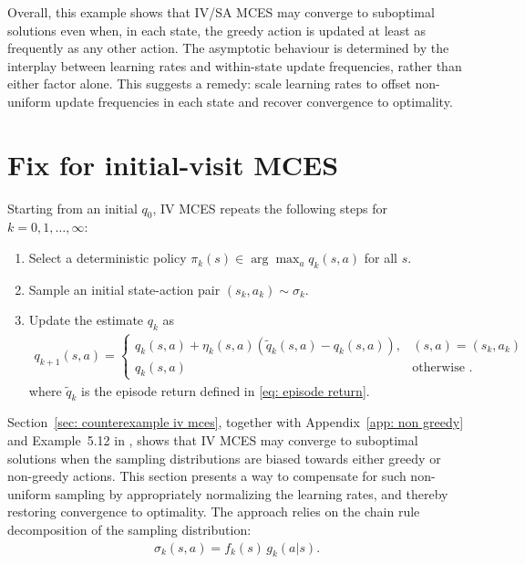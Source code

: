 \documentclass{article}
\begin{document}
Overall,
this example shows that IV/SA MCES may converge to suboptimal solutions even when, in each state, the greedy action is updated at least as frequently as any other action.
The asymptotic behaviour is determined by the interplay
between learning rates and within-state update frequencies, rather than either factor alone.
This suggests a remedy: scale learning rates to offset non-uniform update
frequencies in each state and recover convergence to optimality.


\section{Fix for initial-visit MCES}

Starting from an initial $q_0$,
IV MCES repeats the following steps for $k=0,1,\ldots,\infty$:
\begin{enumerate}
    \item Select a deterministic policy $\pi_k(s) \in \arg\max_a q_k(s,a)$ for all $s$.

    \item Sample an initial state-action pair $(s_k, a_k) \sim \sigma_k$.

    \item Update the estimate $q_k$ as
    \begin{align}
    \label{eq: update iv mcopi}
    q_{k+1}(s,a)
    =
    \begin{cases}
    q_k(s,a) + \eta_k(s,a) \left(\tilde q_k(s,a) - q_k(s,a) \right), & (s,a)=(s_k,a_k) \\
    q_k(s,a) & \text{otherwise .}
    \end{cases}
    \end{align}
    where $\tilde q_k$ is the episode return defined in \eqref{eq: episode return}.
\end{enumerate}

Section~\ref{sec: counterexample iv mces}, together with Appendix~\ref{app: non greedy} and Example~5.12 in \cite{Bertsekas1996Neuro-DynamicProgramming}, shows that IV MCES may converge to suboptimal solutions when the sampling distributions are biased towards either greedy or non-greedy actions.
This section presents a way to compensate for such non-uniform sampling by appropriately normalizing the learning rates, and thereby restoring convergence to optimality.
The approach relies on the chain rule decomposition of the sampling distribution:
\begin{align}
\label{eq: chain rule}
\sigma_k(s,a) = f_k(s) \, g_k(a | s) .
\end{align}
\end{document}
